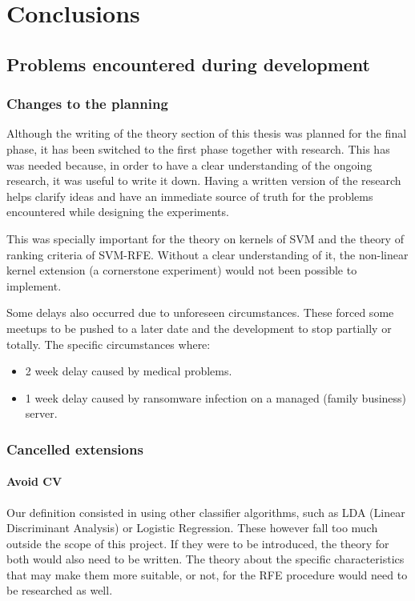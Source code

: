 
\chapter{Conclusions} %

\section{Problems encountered during development}

\subsection*{Changes to the planning}

Although the writing of the theory section of this thesis was planned for the final phase, it has been switched to the first phase together with research. This has was needed because, in order to have a clear understanding of the ongoing research, it was useful to write it down. Having a written version of the research helps clarify ideas and have an immediate source of truth for the problems encountered while designing the experiments.

This was specially important for the theory on kernels of SVM and the theory of ranking criteria of SVM-RFE. Without a clear understanding of it, the non-linear kernel extension (a cornerstone experiment) would not been possible to implement.

Some delays also occurred due to unforeseen circumstances. These forced some meetups to be pushed to a later date and the development to stop partially or totally. The specific circumstances where:

\begin{itemize}
    \item 2 week delay caused by medical problems.
    \item 1 week delay caused by ransomware infection on a managed (family business) server. 
\end{itemize}

\subsection*{Cancelled extensions}

\subsubsection*{Avoid CV}
Our definition consisted in using other classifier algorithms, such as LDA (Linear Discriminant Analysis) or Logistic Regression. These however fall too much outside the scope of this project. If they were to be introduced, the theory for both would also need to be written. The theory about the specific characteristics that may make them more suitable, or not, for the RFE procedure would need to be researched as well.

